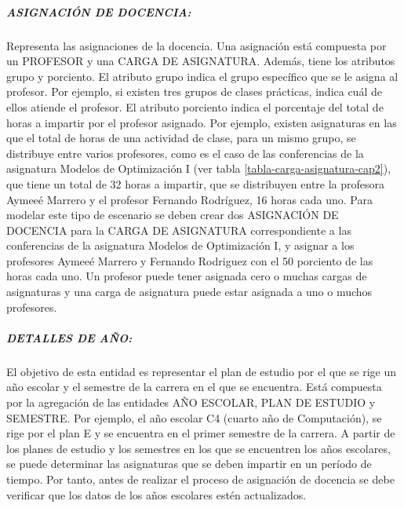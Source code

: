 \subparagraph{ASIGNACIÓN DE DOCENCIA:}
Representa las asignaciones de la docencia. Una asignación está compuesta
por un PROFESOR y una CARGA DE ASIGNATURA. Además, tiene  
los atributos grupo y porciento. El atributo grupo indica el grupo específico que 
se le asigna al profesor. Por ejemplo, si existen tres grupos de clases prácticas, 
indica cuál de ellos atiende el profesor.
El atributo porciento indica el porcentaje del total de horas a impartir por el profesor 
asignado. Por ejemplo, existen asignaturas en las que el total 
de horas de una actividad de clase, para un mismo grupo, se distribuye entre varios profesores, como es el caso de las
conferencias de la asignatura Modelos de Optimización I (ver tabla \ref{tabla-carga-asignatura-cap2}), que tiene un total
de 32 horas a impartir, que se distribuyen entre la profesora Aymeeé Marrero 
y el profesor Fernando Rodríguez, 16 horas cada uno. Para modelar este tipo de escenario
se deben crear dos ASIGNACIÓN DE DOCENCIA para la CARGA DE ASIGNATURA correspondiente a las 
conferencias de la asignatura Modelos de Optimización I, y asignar a los profesores 
Aymeeé Marrero y Fernando Rodriguez con el 50 porciento de las horas cada uno.  
Un profesor puede tener asignada cero o muchas cargas de asignaturas y una carga de 
asignatura puede estar asignada a uno o muchos profesores.


\subparagraph{DETALLES DE AÑO:}
El objetivo de esta entidad es representar el plan de estudio 
por el que se rige un año escolar y el semestre de la carrera en el que 
se encuentra. Está 
compuesta por la agregación de las entidades AÑO ESCOLAR, PLAN DE ESTUDIO y 
SEMESTRE. Por ejemplo, el 
año escolar C4 (cuarto año de Computación), se rige por el plan E y se encuentra en el primer semestre de la carrera.
A partir de los planes de estudio y los semestres en los que se encuentren los años escolares, 
se puede determinar las asignaturas que se deben impartir en un período de tiempo. Por tanto, antes 
de realizar el proceso de asignación de docencia se debe verificar que los datos 
de los años escolares estén actualizados.


    



